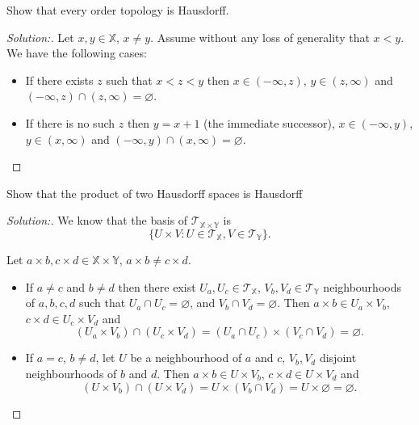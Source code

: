 \documentclass[a4paper,12pt, reqno]{article}
\theoremstyle{definition}
\newenvironment{exerr}[1]{
  \renewcommand\theexeralt{#1}
  \exeralt
}{\endexeralt}
\newenvironment{solution}{\begin{proof}[Solution:]}{\end{proof}}
\newcommand{\T}{\mathscr{T}}
\newcommand{\X}{\mathbb{X}}
\newcommand{\Y}{\mathbb{Y}}
\begin{document}
\begin{exerr}{10}
  Show that every order topology is Hausdorff.
\end{exerr}
\begin{solution}
  Let $x,y\in\X$, $x\neq y$. Assume without any loss of generality that $x<y$. We have the following cases:
  \begin{itemize}
    \item If there exists $z$ such that $x<z<y$ then $x\in(-\infty,z)$, $y\in (z,\infty)$ and $(-\infty,z)\cap(z,\infty) = \varnothing$.
    \item If there is no such $z$ then $y = x+1$ (the immediate successor), $x\in(-\infty,y)$, $y\in(x,\infty)$ and $(-\infty,y)\cap(x,\infty) = \varnothing$.
  \end{itemize}
\end{solution}

\begin{exerr}{11}
  Show that the product of two Hausdorff spaces is Hausdorff
\end{exerr}
\begin{solution}
  We know that the basis of $\T_{\X\times\Y}$ is
  \begin{equation*}
    \{ U\times V : U\in\T_{\X},V\in\T_{\Y} \}.
  \end{equation*}

  Let $a\times b, c\times d\in\X\times\Y$, $a\times b\neq c\times d$.
  \begin{itemize}
    \item If $a\neq c$ and $b\neq d$ then there exist $U_{a},U_{c}\in\T_{\X}$, $V_{b},V_{d}\in\T_{\Y}$ neighbourhoods of $a,b,c,d$ such that $U_{a}\cap U_{c}=\varnothing$, and $V_{b}\cap V_{d}=\varnothing$. Then $a\times b\in U_{a}\times V_{b}$, $c\times d\in U_{c}\times V_{d}$ and
          \begin{equation*}
            (U_{a}\times V_{b})\cap (U_{c}\times V_{d}) = (U_{a}\cap U_{c})\times (V_{c}\cap V_{d}) = \varnothing.
          \end{equation*}
    \item If $a=c$, $b\neq d$, let $U$ be a neighbourhood of $a$ and $c$, $V_{b},V_{d}$ disjoint neighbourhoods of $b$ and $d$. Then $a\times b\in U\times V_{b}$, $c\times d\in U\times V_{d}$ and
          \begin{equation*}
            (U\times V_{b})\cap (U\times V_{d}) = U\times (V_{b}\cap V_{d}) = U\times \varnothing = \varnothing.
          \end{equation*}
  \end{itemize}
\end{solution}
\end{document}
